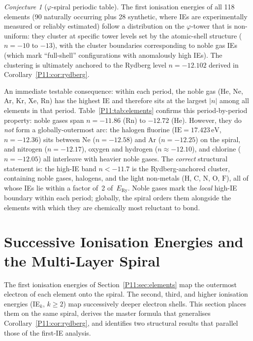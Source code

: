 \documentclass[11pt,a4paper]{article}
\theoremstyle{definition}
\theoremstyle{remark}
\newtheorem{conjecture}{Conjecture}
\newcommand{\vp}{\varphi}
\newcommand{\ERy}{E_{\mathrm{Ry}}}
\newcommand{\IE}{\mathrm{IE}}
\begin{document}
\begin{conjecture}[$\vp$-spiral periodic table]
\label{P11:conj:spiral_pt}
The first ionisation energies of all 118 elements (90 naturally occurring
plus 28 synthetic, where IEs are experimentally measured or reliably estimated)
follow a distribution on the $\vp$-tower that is non-uniform:
they cluster at specific tower levels set by the
atomic-shell structure ($n=-10$ to $-13$), with the cluster
boundaries corresponding to noble gas IEs (which mark
``full-shell'' configurations with anomalously high IEs).
The clustering is ultimately anchored to the Rydberg level
$n = -12.102$ derived in Corollary~\ref{P11:cor:rydberg}.
\end{conjecture}

An immediate testable consequence: within each period, the noble gas
(He, Ne, Ar, Kr, Xe, Rn) has the highest IE and therefore sits at the
largest $|n|$ among all elements in that period.
Table~\ref{P11:tab:elements} confirms this period-by-period property:
noble gases span $n = -11.86$ (Rn) to $-12.72$ (He).
However, they do \emph{not} form a globally-outermost arc:
the halogen fluorine ($\IE = 17.423\,\mathrm{eV}$, $n=-12.36$) sits
between Ne ($n=-12.58$) and Ar ($n=-12.25$) on the spiral,
and nitrogen ($n=-12.17$), oxygen and hydrogen ($n\approx-12.10$), and
chlorine ($n=-12.05$) all interleave with heavier noble gases.
The \emph{correct} structural statement is:
the high-IE band $n < -11.7$ is the Rydberg-anchored cluster,
containing noble gases, halogens, and the light non-metals
($\mathrm{H}$, $\mathrm{C}$, $\mathrm{N}$, $\mathrm{O}$, $\mathrm{F}$),
all of whose IEs lie within a factor of~2 of~$\ERy$.
Noble gases mark the \emph{local} high-IE boundary within each period;
globally, the spiral orders them alongside the elements with which they
are chemically most reluctant to bond.

\section{Successive Ionisation Energies and the Multi-Layer Spiral}
\label{P11:sec:successive_IE}

The first ionisation energies of Section~\ref{P11:sec:elements} map the
outermost electron of each element onto the spiral.  The second, third,
and higher ionisation energies (IE$_k$, $k\geq2$) map successively
deeper electron shells.  This section places them on the same spiral,
derives the master formula that generalises Corollary~\ref{P11:cor:rydberg},
and identifies two structural results that parallel those of the
first-IE analysis.
\end{document}
